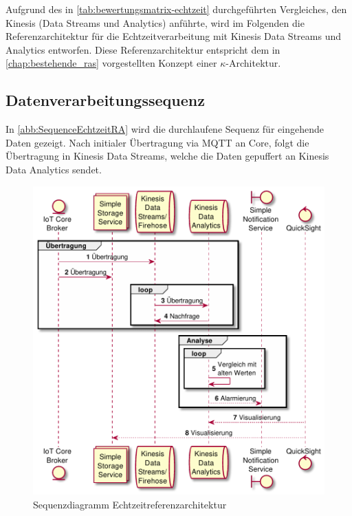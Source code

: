 Aufgrund des in \autoref{tab:bewertungsmatrix-echtzeit} durchgeführten Vergleiches, den Kinesis (Data Streams und Analytics) anführte, wird im Folgenden die Referenzarchitektur für die Echtzeitverarbeitung mit Kinesis Data Streams und Analytics entworfen. Diese Referenzarchitektur entspricht dem in \autoref{chap:bestehende_ras} vorgestellten Konzept einer $\kappa$-Architektur.

\subsection{Datenverarbeitungssequenz}
In \autoref{abb:SequenceEchtzeitRA} wird die durchlaufene Sequenz für eingehende Daten gezeigt. Nach initialer Übertragung via \ac{MQTT} an \AWSIOT{} Core, folgt die Übertragung in Kinesis Data Streams, welche die Daten gepuffert an Kinesis Data Analytics sendet. 

\begin{figure}[H]
\centering
\includegraphics[height=0.6\textheight]{graphics/echtzeit-ra.pdf}
\caption{Sequenzdiagramm Echtzeitreferenzarchitektur}
\label{abb:SequenceEchtzeitRA}
\end{figure}

